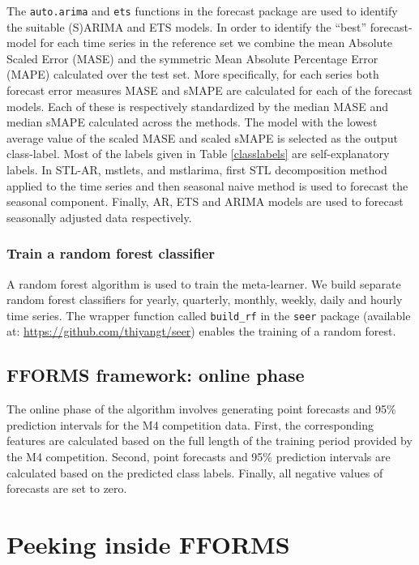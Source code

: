 \documentclass[11pt,a4paper,]{article}
\begin{document}
The \texttt{auto.arima} and \texttt{ets} functions in the forecast
package are used to identify the suitable (S)ARIMA and ETS models. In
order to identify the ``best'' forecast-model for each time series in
the reference set we combine the mean Absolute Scaled Error (MASE) and
the symmetric Mean Absolute Percentage Error (MAPE) calculated over the
test set. More specifically, for each series both forecast error
measures MASE and sMAPE are calculated for each of the forecast models.
Each of these is respectively standardized by the median MASE and median
sMAPE calculated across the methods. The model with the lowest average
value of the scaled MASE and scaled sMAPE is selected as the output
class-label. Most of the labels given in Table \ref{classlabels} are
self-explanatory labels. In STL-AR, mstlets, and mstlarima, first STL
decomposition method applied to the time series and then seasonal naive
method is used to forecast the seasonal component. Finally, AR, ETS and
ARIMA models are used to forecast seasonally adjusted data respectively.

\subsubsection{Train a random forest
classifier}\label{train-a-random-forest-classifier}

A random forest algorithm is used to train the meta-learner. We build
separate random forest classifiers for yearly, quarterly, monthly,
weekly, daily and hourly time series. The wrapper function called
\texttt{build\_rf} in the \texttt{seer} package (available at:
\url{https://github.com/thiyangt/seer}) enables the training of a random
forest.

\subsection{FFORMS framework: online
phase}\label{fforms-framework-online-phase}

The online phase of the algorithm involves generating point forecasts
and 95\% prediction intervals for the M4 competition data. First, the
corresponding features are calculated based on the full length of the
training period provided by the M4 competition. Second, point forecasts
and 95\% prediction intervals are calculated based on the predicted
class labels. Finally, all negative values of forecasts are set to zero.

\section{Peeking inside FFORMS}\label{machinelearning}
\end{document}
